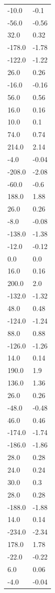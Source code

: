 \begin{longtable}{ll}
-10.0 & -0.1 \\
-56.0 & -0.56 \\
32.0 & 0.32 \\
-178.0 & -1.78 \\
-122.0 & -1.22 \\
26.0 & 0.26 \\
-16.0 & -0.16 \\
56.0 & 0.56 \\
16.0 & 0.16 \\
10.0 & 0.1 \\
74.0 & 0.74 \\
214.0 & 2.14 \\
-4.0 & -0.04 \\
-208.0 & -2.08 \\
-60.0 & -0.6 \\
188.0 & 1.88 \\
26.0 & 0.26 \\
-8.0 & -0.08 \\
-138.0 & -1.38 \\
-12.0 & -0.12 \\
0.0 & 0.0 \\
16.0 & 0.16 \\
200.0 & 2.0 \\
-132.0 & -1.32 \\
48.0 & 0.48 \\
-124.0 & -1.24 \\
88.0 & 0.88 \\
-126.0 & -1.26 \\
14.0 & 0.14 \\
190.0 & 1.9 \\
136.0 & 1.36 \\
26.0 & 0.26 \\
-48.0 & -0.48 \\
46.0 & 0.46 \\
-174.0 & -1.74 \\
-186.0 & -1.86 \\
28.0 & 0.28 \\
24.0 & 0.24 \\
30.0 & 0.3 \\
28.0 & 0.28 \\
-188.0 & -1.88 \\
14.0 & 0.14 \\
-234.0 & -2.34 \\
178.0 & 1.78 \\
-22.0 & -0.22 \\
6.0 & 0.06 \\
-4.0 & -0.04 \\

\end{longtable}
